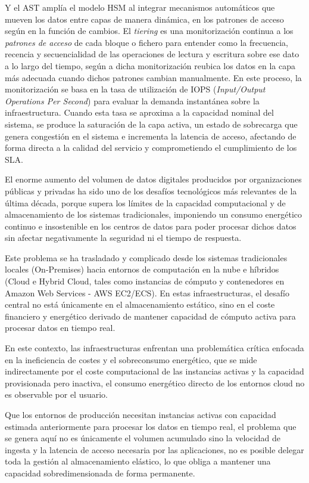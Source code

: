 Y el AST amplía el modelo HSM al integrar mecanismos automáticos que mueven los datos entre capas de manera dinámica, en los patrones de acceso según en la función de cambios.
El \textit{tiering} es una monitorización continua a los \textit{patrones de acceso} de cada bloque o fichero para entender como la frecuencia, recencia y secuencialidad de las operaciones de lectura y escritura sobre ese dato a lo largo del tiempo, según a dicha monitorización reubica los datos en la capa más adecuada cuando dichos patrones cambian manualmente.
En este proceso, la monitorización se basa en la tasa de utilización de IOPS (\textit{Input/Output Operations Per Second}) para evaluar la demanda instantánea sobre la infraestructura.
Cuando esta tasa se aproxima a la capacidad nominal del sistema, se produce la saturación de la capa activa, un estado de sobrecarga que genera congestión en el sistema e incrementa la latencia de acceso, afectando de forma directa a la calidad del servicio y comprometiendo el cumplimiento de los SLA.

El enorme aumento del volumen de datos digitales producidos por organizaciones públicas y privadas ha sido uno de los desafíos tecnológicos más relevantes de la última década, porque supera los límites de la capacidad computacional y de almacenamiento de los sistemas tradicionales,
imponiendo un consumo energético continuo e insostenible en los centros de datos para poder procesar dichos datos sin afectar negativamente la seguridad ni el tiempo de respuesta.

Este problema se ha trasladado y complicado desde los sistemas tradicionales locales (On-Premises) hacia entornos de computación en la nube e híbridos (Cloud e Hybrid Cloud, tales como instancias de cómputo y contenedores en Amazon Web Services - AWS EC2/ECS).
En estas infraestructuras, el desafío central no está únicamente en el almacenamiento estático, sino en el coste financiero y energético derivado de mantener capacidad de cómputo activa para procesar datos en tiempo real.

En este contexto, las infraestructuras enfrentan una problemática crítica enfocada en la ineficiencia de costes y el sobreconsumo energético, que se mide indirectamente por el coste computacional de las instancias activas y la capacidad provisionada pero inactiva,
el consumo energético directo de los entornos cloud no es observable por el usuario.

Que los entornos de producción necesitan instancias activas con capacidad estimada anteriormente para procesar los datos en tiempo real, el problema que se genera aquí no es únicamente el volumen acumulado sino la velocidad de ingesta y la latencia de acceso necesaria por las aplicaciones, no es posible delegar toda la gestión al almacenamiento elástico, lo que obliga a mantener una capacidad sobredimensionada de forma permanente.


